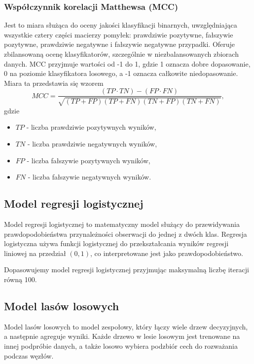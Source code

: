 \documentclass[12pt]{article}
\begin{document}
	\subsubsection{Współczynnik korelacji Matthewsa (MCC)}
	Jest to miara służąca do oceny jakości klasyfikacji binarnych, uwzględniająca wszystkie cztery części macierzy pomyłek: prawdziwie pozytywne, fałszywie pozytywne, prawdziwie negatywne i fałszywie negatywne przypadki. Oferuje zbilansowaną ocenę klasyfikatorów, szczególnie w niezbalansowanych zbiorach danych. MCC przyjmuje wartości od -1 do 1, gdzie 1 oznacza dobre dopasowanie, 0 na poziomie klasyfikatora losowego, a -1 oznacza całkowite niedopasowanie. Miara ta przedstawia się wzorem
	\[MCC = \frac{(TP \cdot TN) - (FP \cdot FN)}{\sqrt{(TP + FP)(TP + FN)(TN + FP)(TN + FN)}},\] 
	gdzie
	\begin{itemize}
		\item $TP$ - liczba prawdziwie pozytywnych wyników,
		\item $TN$ - liczba prawdziwie negatywnych wyników,
		\item $FP$ - liczba fałszywie pozytywnych wyników,
		\item $FN$ - liczba fałszywie negatywnych wyników.
	\end{itemize}
	
	\subsection{Model regresji logistycznej}\label{subsec:model-regresji-logistycznej}
	Model regresji logistycznej to matematyczny model służący do przewidywania prawdopodobieństwa przynależności obserwacji do jednej z dwóch klas. Regresja logistyczna używa funkcji logistycznej do przekształcania wyników regresji liniowej na przedział $(0,1)$, co interpretowane jest jako prawdopodobieństwo.
	
	\vspace{0.25cm}
	
	Dopasowujemy model regresji logistycznej przyjmując maksymalną liczbę iteracji równą 100.
	
	\subsection{Model lasów losowych}\label{subsec:model-lasów-losowych}
	Model lasów losowych to model zespołowy, który łączy wiele drzew decyzyjnych, a następnie agreguje wyniki. Każde drzewo w lesie losowym jest trenowane na innej podpróbie danych, a także losowo wybiera podzbiór cech do rozważania podczas węzłów. 
	
\end{document}
